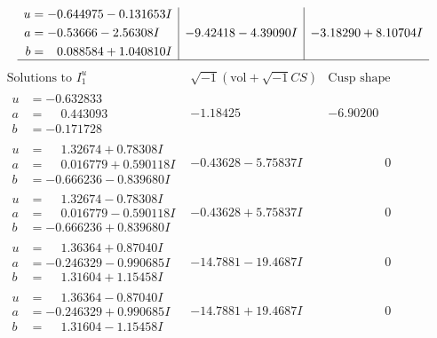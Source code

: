 \documentclass[1p]{elsarticle_modified}
\theoremstyle{definition}
\newcommand{\I}{\sqrt{-1}}
\begin{document}
$$\begin{array}{c|c|c}
\begin{aligned}
u &= -0.644975 - 0.131653 I \\
a &= -0.53666 - 2.56308 I \\
b &= \phantom{-}0.088584 + 1.040810 I\end{aligned}
 & -9.42418 - 4.39090 I & -3.18290 + 8.10704 I\\
 \hline 
 \end{array}$$\newpage$$\begin{array}{c|c|c}  
\text{Solutions to }I^u_{1}& \I (\text{vol} + \sqrt{-1}CS) & \text{Cusp shape}\\
 \hline 
\begin{aligned}
u &= -0.632833\phantom{ +0.000000I} \\
a &= \phantom{-}0.443093\phantom{ +0.000000I} \\
b &= -0.171728\phantom{ +0.000000I}\end{aligned}
 & -1.18425\phantom{ +0.000000I} & -6.90200\phantom{ +0.000000I} \\ \hline\begin{aligned}
u &= \phantom{-}1.32674 + 0.78308 I \\
a &= \phantom{-}0.016779 + 0.590118 I \\
b &= -0.666236 - 0.839680 I\end{aligned}
 & -0.43628 - 5.75837 I & \phantom{-0.000000 } 0 \\ \hline\begin{aligned}
u &= \phantom{-}1.32674 - 0.78308 I \\
a &= \phantom{-}0.016779 - 0.590118 I \\
b &= -0.666236 + 0.839680 I\end{aligned}
 & -0.43628 + 5.75837 I & \phantom{-0.000000 } 0 \\ \hline\begin{aligned}
u &= \phantom{-}1.36364 + 0.87040 I \\
a &= -0.246329 - 0.990685 I \\
b &= \phantom{-}1.31604 + 1.15458 I\end{aligned}
 & -14.7881 - 19.4687 I & \phantom{-0.000000 } 0 \\ \hline\begin{aligned}
u &= \phantom{-}1.36364 - 0.87040 I \\
a &= -0.246329 + 0.990685 I \\
b &= \phantom{-}1.31604 - 1.15458 I\end{aligned}
 & -14.7881 + 19.4687 I & \phantom{-0.000000 } 0 \\ \hline\begin{aligned}

\end{aligned}
\end{array}$$
\end{document}
